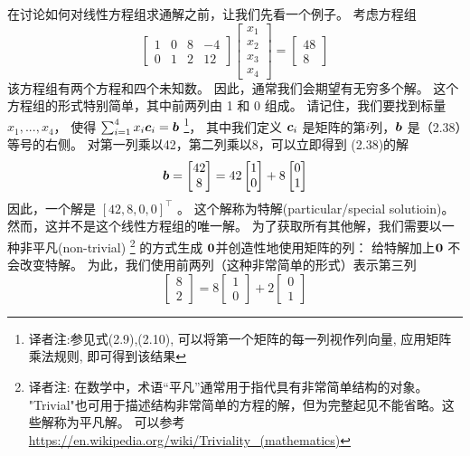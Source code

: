 在讨论如何对线性方程组求通解之前，让我们先看一个例子。
考虑方程组
\begin{equation}
    \begin{bmatrix}
        1 & 0 & 8 & -4 \\
        0 & 1 & 2 & 12
    \end{bmatrix}
    \begin{bmatrix}
        x_1 \\ x_2 \\ x_3 \\ x_4
    \end{bmatrix}
    =
    \begin{bmatrix}
        48 \\ 8
    \end{bmatrix}
\end{equation}
该方程组有两个方程和四个未知数。
因此，通常我们会期望有无穷多个解。
这个方程组的形式特别简单，其中前两列由 1 和 0 组成。
请记住，我们要找到标量 $x_1 , ..., x_4$，
使得 $\sum_{i=1}^{4} x_i \boldsymbol{c}_i = \boldsymbol{b}$
\footnote{
    译者注:参见式(2.9),(2.10), 可以将第一个矩阵的每一列视作列向量, 应用矩阵乘法规则, 即可得到该结果
}，
其中我们定义 $\boldsymbol{c}_i$ 是矩阵的第$i$列，$\boldsymbol{b}$ 是（2.38）等号的右侧。
对第一列乘以42，第二列乘以8，可以立即得到 (2.38)的解
\begin{equation}
    \boldsymbol{b} =
    \begin{bmatrix}
        42 \\ 8
    \end{bmatrix}
    = 42
    \begin{bmatrix}
        1 \\ 0
    \end{bmatrix}
    +8
    \begin{bmatrix}
        0 \\ 1
    \end{bmatrix}
\end{equation}
因此，一个解是 $[42, 8, 0, 0]^\top$ 。
这个解称为特解(particular/special solutioin)。
然而，这并不是这个线性方程组的唯一解。
为了获取所有其他解，我们需要以一种非平凡(non-trivial)
\footnote{
    译者注:
    在数学中，术语“平凡”通常用于指代具有非常简单结构的对象。
    "Trivial"也可用于描述结构非常简单的方程的解，但为完整起见不能省略。这些解称为平凡解。
    可以参考\url{https://en.wikipedia.org/wiki/Triviality_(mathematics)}
}
的方式生成 $\boldsymbol{0}$并创造性地使用矩阵的列：
给特解加上$\boldsymbol{0}$ 不会改变特解。
为此，我们使用前两列（这种非常简单的形式）表示第三列
\begin{equation}
    \begin{bmatrix} 8 \\ 2 \end{bmatrix}
    =8
    \begin{bmatrix} 1 \\ 0 \end{bmatrix}
    +2
    \begin{bmatrix} 0 \\ 1 \end{bmatrix}
\end{equation}
